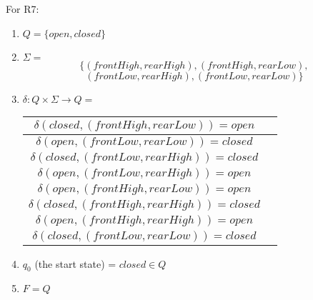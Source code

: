 \documentclass[11pt,a4paper]{article}
\begin{document}
\begin{enumerate}
            For R7:
            \begin{enumerate}
                \item $Q = \{open, closed\}$
                \item $\Sigma =$ \[ \{(frontHigh, rearHigh), (frontHigh, rearLow), \]\[(frontLow, rearHigh), (frontLow, rearLow)\} \]
                \item $\delta \colon Q \times \Sigma \rightarrow Q =$
                \begin{tabular}{|c|c|}
                    \hline
                    $\delta(closed, (frontHigh, rearLow) ) = open$ \\
                    \hline
                    $\delta(open, (frontLow, rearLow) ) = closed$ \\
                    \hline
                    $\delta(closed, (frontLow, rearHigh) ) = closed$ \\
                    \hline
                    $\delta(open, (frontLow, rearHigh) ) = open$ \\
                    \hline
                    $\delta(open, (frontHigh, rearLow) ) = open$ \\
                    \hline
                    $\delta(closed, (frontHigh, rearHigh) ) = closed$ \\
                    \hline
                    $\delta(open, (frontHigh, rearHigh) ) = open$ \\
                    \hline
                    $\delta(closed, (frontLow, rearLow) ) = closed$ \\
                    \hline
                \end{tabular}
                \item $q_0$ (the start state) = $closed \in Q$
                \item $F = Q$
            \end{enumerate}


            
            
        \end{enumerate}
            

    
\end{document}
